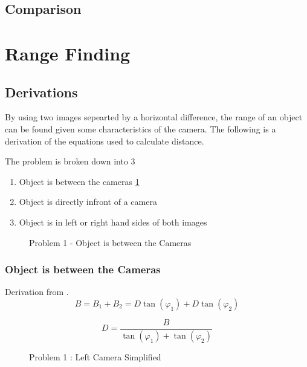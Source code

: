 \subsection{Comparison}



\section{Range Finding}

\subsection{Derivations}

By using two images sepearted by a horizontal difference, the range of an object can be found given some characteristics of the camera. The following is a derivation of the equations used to calculate distance. 

The problem is broken down into 3
\begin{enumerate}
\item Object is between the cameras \ref{problem_between}
\item Object is directly infront of a camera
\item Object is in left or right hand sides of both images
\end{enumerate}

\begin{figure}
\caption{Problem 1 - Object is between the Cameras}
\label{problem_between}
\end{figure}

\subsubsection{Object is between the Cameras}
Derivation from \cite{Mrovlje:Distance_Stereoscopic}.
\begin{equation} \label{eq:B}
B = B_{1} + B_{2} = D\tan(\varphi_{1}) + D\tan(\varphi_{2})
\end{equation}

\begin{equation} \label{eq:D}
D = \frac{B}{\tan(\varphi_{1}) + \tan(\varphi_{2})}
\end{equation}


\begin{figure}
\caption{Problem 1 : Left Camera Simplified}
\label{Left_Simplified}
\end{figure}

